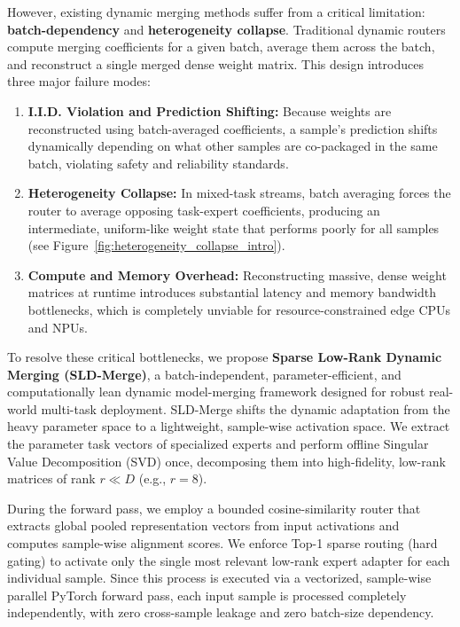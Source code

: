 However, existing dynamic merging methods suffer from a critical limitation: \textbf{batch-dependency} and \textbf{heterogeneity collapse}. Traditional dynamic routers compute merging coefficients for a given batch, average them across the batch, and reconstruct a single merged dense weight matrix. This design introduces three major failure modes:
\begin{enumerate}
    \item \textbf{I.I.D. Violation and Prediction Shifting:} Because weights are reconstructed using batch-averaged coefficients, a sample's prediction shifts dynamically depending on what other samples are co-packaged in the same batch, violating safety and reliability standards.
    \item \textbf{Heterogeneity Collapse:} In mixed-task streams, batch averaging forces the router to average opposing task-expert coefficients, producing an intermediate, uniform-like weight state that performs poorly for all samples (see Figure~\ref{fig:heterogeneity_collapse_intro}).
    \item \textbf{Compute and Memory Overhead:} Reconstructing massive, dense weight matrices at runtime introduces substantial latency and memory bandwidth bottlenecks, which is completely unviable for resource-constrained edge CPUs and NPUs.
\end{enumerate}

To resolve these critical bottlenecks, we propose \textbf{Sparse Low-Rank Dynamic Merging (SLD-Merge)}, a batch-independent, parameter-efficient, and computationally lean dynamic model-merging framework designed for robust real-world multi-task deployment. 
SLD-Merge shifts the dynamic adaptation from the heavy parameter space to a lightweight, sample-wise activation space. We extract the parameter task vectors of specialized experts and perform offline Singular Value Decomposition (SVD) once, decomposing them into high-fidelity, low-rank matrices of rank $r \ll D$ (e.g., $r=8$). 

During the forward pass, we employ a bounded cosine-similarity router that extracts global pooled representation vectors from input activations and computes sample-wise alignment scores. We enforce Top-1 sparse routing (hard gating) to activate only the single most relevant low-rank expert adapter for each individual sample. Since this process is executed via a vectorized, sample-wise parallel PyTorch forward pass, each input sample is processed completely independently, with zero cross-sample leakage and zero batch-size dependency.

